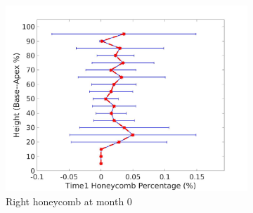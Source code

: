 \begin{figure}[H]
\begin{subfigure}{.42\linewidth}
  \includegraphics[width=\linewidth,trim={{.0\wd0} {.0\wd0} {.0\wd0} {.0\wd0}},clip]{QuantitativeAnalysis/Image/RightLungHoneycombDiseaseAgainstHeightTime1.jpg}
  \caption{Right honeycomb at month 0}
  \label{fig:DiseaseAgainstHeightTime1-f}
\end{subfigure}
\begin{subfigure}{.42\linewidth}%

\end{subfigure}
\end{figure}
